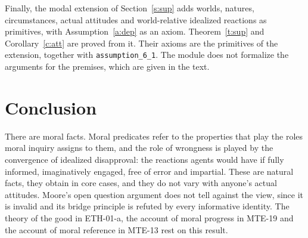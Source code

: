 \documentclass{situationist-preprint}
\begin{document}
Finally, the modal extension of Section~\ref{s:sup} adds worlds, natures, circumstances, actual attitudes and world-relative idealized reactions as primitives, with Assumption~\ref{a:dep} as an axiom. Theorem~\ref{t:sup} and Corollary~\ref{c:att} are proved from it. Their axioms are the primitives of the extension, together with \texttt{assumption\_6\_1}. The module does not formalize the arguments for the premises, which are given in the text.

\section{Conclusion}

There are moral facts. Moral predicates refer to the properties that play the roles moral inquiry assigns to them, and the role of wrongness is played by the convergence of idealized disapproval: the reactions agents would have if fully informed, imaginatively engaged, free of error and impartial. These are natural facts, they obtain in core cases, and they do not vary with anyone's actual attitudes. Moore's open question argument does not tell against the view, since it is invalid and its bridge principle is refuted by every informative identity. The theory of the good in ETH-01-a, the account of moral progress in MTE-19 and the account of moral reference in MTE-13 rest on this result.
\end{document}
